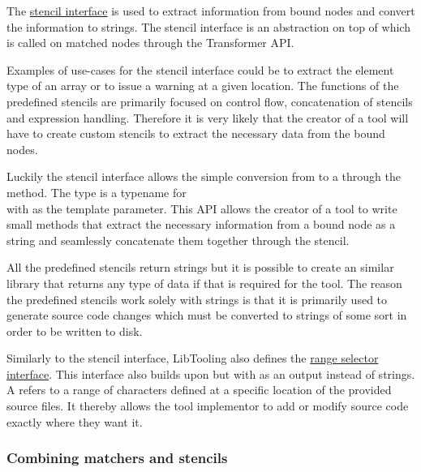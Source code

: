 The \href{https://github.com/llvm/llvm-project/blob/main/clang/include/clang/Tooling/Transformer/Stencil.h}{stencil interface} is used to extract information from bound nodes and convert the information to strings.  The stencil interface is an abstraction on top of  which is called on matched nodes through the Transformer API. 

Examples of use-cases for the stencil interface could be to extract the element type of an array or to issue a warning at a given location. The functions of the predefined stencils are primarily focused on control flow, concatenation of stencils and expression handling. Therefore it is very likely that the creator of a tool will have to create custom stencils to extract the necessary data from the bound nodes.

Luckily the stencil interface allows the simple conversion from  to a  through the  method. The  type is a typename for \\  with  as the template parameter. This API allows the creator of a tool to write small methods that extract the necessary information from a bound node as a string and seamlessly concatenate them together through the  stencil.

All the predefined stencils return strings but it is possible to create an similar library that returns any type of data if that is required for the tool. The reason the predefined stencils work solely with strings is that it is primarily used to generate source code changes which must be converted to strings of some sort in order to be written to disk. 

Similarly to the stencil interface, LibTooling also defines the \href{https://github.com/llvm/llvm-project/blob/main/clang/include/clang/Tooling/Transformer/RangeSelector.h}{range selector interface}.
This interface also builds upon  but with  as an output instead of strings. A  refers to a range of characters defined at a specific location of the provided source files. It thereby allows the tool implementor to add or modify source code exactly where they want it.

\subsubsection*{Combining matchers and stencils}

